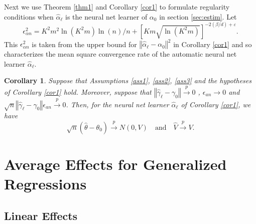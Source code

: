 \documentclass[aos]{imsart}
\numberwithin{equation}{section}
\theoremstyle{plain}
\newtheorem{corollary}[theorem]{Corollary}
\theoremstyle{remark}
\begin{document}
Next we use Theorem \ref{thm1} and Corollary \ref{cor1} to formulate regularity conditions when
$\hat{\alpha}_{\ell}$ is the neural net learner of $\alpha_{0}$ in section \ref{sec:estim}. Let
\[
\epsilon_{\alpha n}^2=K^{2}m^{2}\ln(K^{2}m)\ln(n)/n+[Km\sqrt{\ln(K^{2}%
m)}]^{-2(\beta/d)+\varepsilon}.
\]
This $\epsilon_{\alpha n}^2$ is taken from the upper bound for $\left\Vert\hat{\alpha}_{\ell}-\alpha_{0}\right\Vert ^{2}$ in Corollary \ref{cor1} and so characterizes the mean square convergence rate of the automatic neural net learner $\hat{\alpha}_{\ell}$.

\begin{corollary}\label{cor2}
    Suppose that Assumptions \ref{ass1}, \ref{ass2}, \ref{ass3} and the hypotheses of Corollary \ref{cor1} hold. Moreover, suppose that $\left\Vert \hat{\gamma}_{\ell}-\gamma_{0}\right\Vert \overset{p}{\to}0$ , $\epsilon_{an} \to 0$ and $\sqrt{n}\left\Vert \hat{\gamma}_{\ell} - \gamma_{0}\right\Vert \epsilon_{an} \overset{p}{\to}0$. Then, for the neural net learner $\hat{\alpha}_\ell$ of Corollary \ref{cor1}, we have
    \[
    \sqrt{n}(\hat{\theta}-\theta_{0})\overset{p}{\to}N(0,V)\quad\text{and}\quad\hat{V}\overset{p}{\to}V.
    \]
\end{corollary}



\section{Average Effects for Generalized Regressions} \label{sec:ext}
\subsection{Linear  Effects}\label{sec:gener}
\end{document}
